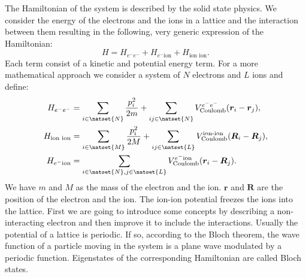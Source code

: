\documentclass[../main.tex]{subfile}
\begin{document}
The Hamiltonian of the system is described by the solid state physics. We consider the energy of the electrons and the ions in a lattice and the interaction between them resulting in 
the following, very generic expression of the Hamiltonian:
\[
    H = H_{e^-e^-} + H_{e^-\text{ion}} + H_{\text{ion ion}}.
\]
Each term consist of a kinetic and potential energy term. For a more mathematical approach we consider a system of $N$ electrons and $L$ ions and define:
\begin{align*}
    H_{e^-e^-} &= \sum_{i \in \natset{N}} \frac{p_i^2}{2m} + \sum_{ij\in\natset{N}} V_{\text{Coulomb}}^{e^-e^-}(\bm{r}_i-\bm{r}_j), \\
    H_{\text{ion ion}} &=  \sum_{i \in \natset{M}} \frac{p_i^2}{2M} + \sum_{ij\in\natset{L}} V_{\text{Coulomb}}^{\text{ion-ion}}(\bm{R}_i-\bm{R}_j), \\
    H_{e^-\text{ion}} &= \sum_{i\in \natset{N},j\in \natset{L}} V_{\text{Coulomb}}^{e^-\text{ion}}(\bm{r}_i-\bm{R}_j).
\end{align*}
We have $m$ and $M$ as the mass of the electron and the ion. $\bm{r}$ and $\bm{R}$ are the position of the electron and the ion. The ion-ion potential
freezes the ions into the lattice. 
First we are going to introduce some concepts by describing a non-interacting electron and then improve it to include the interactions.
Usually the potential of a lattice is periodic. If so, according to the Bloch theorem, the wave function of a particle moving in the system is a plane wave modulated
by a periodic function. Eigenstates of the corresponding Hamiltonian are called Bloch states.
\end{document}
